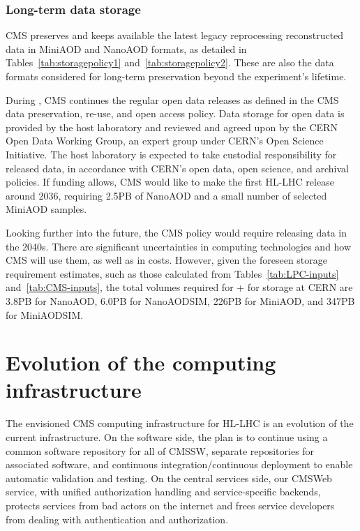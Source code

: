 \subsubsection{Long-term data storage}
\label{sec:pres-impl-storage}

CMS preserves and keeps available the latest legacy reprocessing reconstructed data in MiniAOD and NanoAOD formats, as detailed in Tables~\ref{tab:storagepolicy1} and~\ref{tab:storagepolicy2}. These are also the data formats considered for long-term preservation beyond the experiment’s lifetime. 

During \PhaseTwo, CMS continues the regular open data releases as defined in the CMS data preservation, re-use, and open access policy. Data storage for open data is provided by the host laboratory and reviewed and agreed upon by the CERN Open Data Working Group, an expert group under CERN’s Open Science Initiative. The host laboratory is expected to take custodial responsibility for released data, in accordance with CERN’s open data, open science, and archival policies. If funding allows, CMS would like to make the first HL-LHC release around 2036, requiring 2.5\unit{PB} of NanoAOD and a small number of selected MiniAOD samples. 

Looking further into the future, the CMS policy would require releasing data in the 2040s. There are significant uncertainties in computing technologies and how CMS will use them, as well as in costs. However, given the foreseen storage requirement estimates, such as those calculated from Tables~\ref{tab:LPC-inputs} and~\ref{tab:CMS-inputs}, the total volumes required for \RunFour + \RunFive for storage at CERN are 3.8\unit{PB} for NanoAOD, 6.0\unit{PB} for NanoAOD\gls{SIM}, 226\unit{PB} for MiniAOD, and 347\unit{PB} for MiniAOD\gls{SIM}.

\clearpage

%
%
% 
\section{Evolution of the computing infrastructure}
\label{sec:Infrastructure}

The envisioned CMS computing infrastructure for \gls{HL-LHC} is an evolution of the current infrastructure. On the software side, the plan is to continue using a common software repository for all of CMSSW, separate repositories for associated software, and continuous integration/continuous deployment to enable automatic validation and testing. On the central services side, our CMSWeb service, with unified authorization handling and service-specific backends, protects services from bad actors on the internet and frees service developers from dealing with authentication and authorization.

